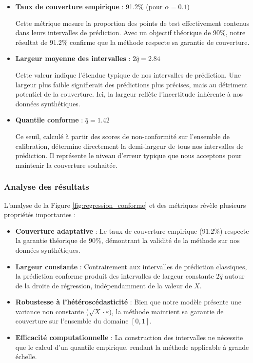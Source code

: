 \documentclass[a4paper,12pt]{article}
\begin{document}
\begin{itemize}
\item \textbf{Taux de couverture empirique} : 91.2\% (pour $\alpha = 0.1$)
    
    Cette métrique mesure la proportion des points de test effectivement contenus dans leurs intervalles de prédiction. Avec un objectif théorique de 90\%, notre résultat de 91.2\% confirme que la méthode respecte sa garantie de couverture.

\item \textbf{Largeur moyenne des intervalles} : $2\hat{q} = 2.84$
    
    Cette valeur indique l'étendue typique de nos intervalles de prédiction. Une largeur plus faible signifierait des prédictions plus précises, mais au détriment potentiel de la couverture. Ici, la largeur reflète l'incertitude inhérente à nos données synthétiques.

\item \textbf{Quantile conforme} : $\hat{q} = 1.42$
    
    Ce seuil, calculé à partir des scores de non-conformité sur l'ensemble de calibration, détermine directement la demi-largeur de tous nos intervalles de prédiction. Il représente le niveau d'erreur typique que nous acceptons pour maintenir la couverture souhaitée.
\end{itemize}

\subsubsection{Analyse des résultats}

L'analyse de la Figure \ref{fig:regression_conforme} et des métriques révèle plusieurs propriétés importantes :

\begin{itemize}
\item \textbf{Couverture adaptative} : Le taux de couverture empirique (91.2\%) respecte la garantie théorique de 90\%, démontrant la validité de la méthode sur nos données synthétiques.

\item \textbf{Largeur constante} : Contrairement aux intervalles de prédiction classiques, la prédiction conforme produit des intervalles de largeur constante $2\hat{q}$ autour de la droite de régression, indépendamment de la valeur de $X$.

\item \textbf{Robustesse à l'hétéroscédasticité} : Bien que notre modèle présente une variance non constante ($\sqrt{X} \cdot \varepsilon$), la méthode maintient sa garantie de couverture sur l'ensemble du domaine $[0,1]$.

\item \textbf{Efficacité computationnelle} : La construction des intervalles ne nécessite que le calcul d'un quantile empirique, rendant la méthode applicable à grande échelle.
\end{itemize}
\end{document}
